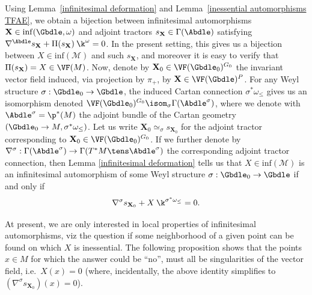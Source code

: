 Using Lemma~\ref{infinitesimal deformation} and Lemma~\ref{inessential automorphisms TFAE}, we obtain a bijection between inf\/initesimal automorphisms $\mathbf{X} \in \mathrm{inf}(\Gbdle,\omega)$ and adjoint tractors $s_{\mathbf{X}} \in \Gamma(\Abdle)$ satisfying $\nabla^{\Abdle}s_{\mathbf{X}} + \Pi(s_{\mathbf{X}}) \: \k^{\omega} = 0$. In the present setting, this gives us a bijection between $X \in \mathrm{inf}(\mathcal{M})$ and such $s_{\mathbf{X}}$, and moreover it is easy to verify that $\Pi(s_{\mathbf{X}}) = X \in \VF(M)$. Now, denote by $\mathbf{X}_0 \in \VF(\Gbdle_0)^{G_0}$ the invariant vector f\/ield induced, via projection by $\pi_+$, by $\mathbf{X} \in \VF(\Gbdle)^P$. For any Weyl structure $\sigma: \Gbdle_0 \rightarrow \Gbdle$, the induced Cartan connection $\sigma^*\omega_{\leq}$ gives us an isomorphism denoted $\VF(\Gbdle_0)^{G_0} \isom_{\sigma} \Gamma(\Abdle^{\sigma})$, where we denote with $\Abdle^{\sigma} = \p^*(M)$ the adjoint bundle of the Cartan geometry $(\Gbdle_0 \rightarrow M,\sigma^*\omega_{\leq})$. Let us write $\mathbf{X}_0 \simeq_{\sigma} s_{\mathbf{X}_0}$ for the adjoint tractor corresponding to $\mathbf{X}_0 \in \VF(\Gbdle_0)^{G_0}$. If we further denote by $\nabla^{\sigma}: \Gamma(\Abdle^{\sigma}) \rightarrow \Gamma(T^*M\tens\Abdle^{\sigma})$ the corresponding adjoint tractor connection, then Lemma \ref{infinitesimal deformation} tells us that $X \in \mathrm{inf}(\mathcal{M})$ is an inf\/initesimal automorphism of some Weyl structure $\sigma: \Gbdle_0 \rightarrow \Gbdle$ if and only if
\[
\nabla^{\sigma} s_{\mathbf{X}_0} + X \: \k^{\sigma^*\omega_{\leq}} = 0.
\]

At present, we are only interested in local properties of inf\/initesimal automorphisms, viz the question if some neighborhood of a given point can be found on which $X$ is inessential. The following proposition shows that the points $x \in M$ for which the answer could be ``no'', must all be singularities of the vector f\/ield, i.e.\ $X(x)=0$ (where, incidentally, the above identity simplif\/ies to $(\nabla^{\sigma} s_{\mathbf{X}_0})(x) = 0$).
